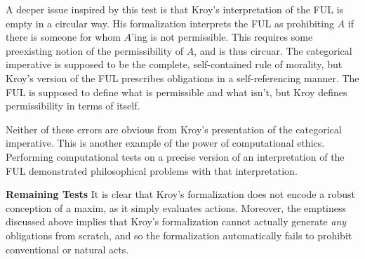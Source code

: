 \begin{isabellebody}
\begin{isamarkuptext}
        A deeper issue inspired by this test is that Kroy's interpretation of the FUL is 
        empty in a circular way. His formalization interprets the FUL as prohibiting $A$ if there is someone for whom 
        $A$'ing is not permissible. This requires some preexisting notion of the permissibility of $A$, and 
        is thus circuar. The categorical imperative is supposed to be the complete,
        self-contained rule of morality, but Kroy's version of the FUL prescribes obligations 
        in a self-referencing manner. The FUL is supposed to define what is permissible and what isn't, 
        but Kroy defines permissibility in terms of itself.
        
        Neither of these errors are obvious from Kroy's presentation of  
        the categorical imperative. This is another example of the power of computational ethics. Performing
        computational tests on a precise version of an interpretation of the FUL demonstrated philosophical problems
        with that interpretation.%
\end{isamarkuptext}\isamarkuptrue%
%
\begin{isamarkuptext}%
\noindent \textbf{Remaining Tests} It is clear that Kroy's formalization does not encode a robust conception of a maxim, as it
simply evaluates actions. Moreover, the emptiness discussed above implies that Kroy's formalization 
cannot actually generate \emph{any} obligations from scratch, and so the formalization automatically
fails to prohibit conventional or natural acts. 


\end{isamarkuptext}
\end{isabellebody}
